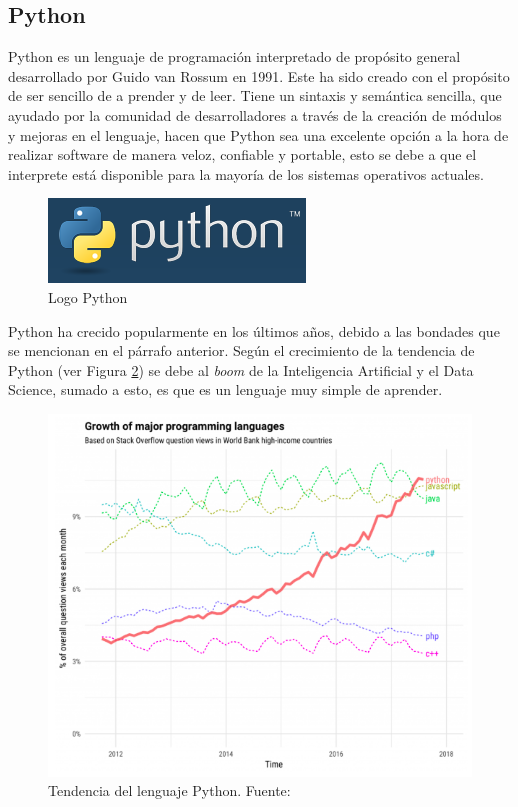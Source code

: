 \documentclass[12pt]{article}
\begin{document}
\subsection{Python}
Python es un lenguaje de programación interpretado de propósito general desarrollado por Guido van Rossum en 1991. Este ha sido creado con el propósito de ser sencillo de a prender y de leer. Tiene un sintaxis y semántica sencilla, que ayudado por la comunidad de desarrolladores a través de la creación de módulos y mejoras en el lenguaje, hacen que Python sea una excelente opción a la hora de realizar software de manera veloz, confiable y portable, esto se debe a que el interprete está disponible para la mayoría de los sistemas operativos actuales. 

\begin{figure}[H]
	\centering
	\includegraphics[width=0.7\linewidth]{python}
	\caption{Logo Python}
	\label{fig:python}
\end{figure}


Python ha crecido popularmente en los últimos años, debido a las bondades que se mencionan en el párrafo anterior. Según \cite{python-trend} el crecimiento de la tendencia de Python (ver Figura \ref{fig:pythontrend}) se debe al \textit{boom} de la Inteligencia Artificial y el Data Science, sumado a esto, es que es un lenguaje muy simple de aprender. 

\begin{figure}
	\centering
	\includegraphics[width=0.7\linewidth]{pythontrend}
	\caption{Tendencia del lenguaje Python. Fuente: \cite{python-trend}}
	\label{fig:pythontrend}
\end{figure}
\end{document}
